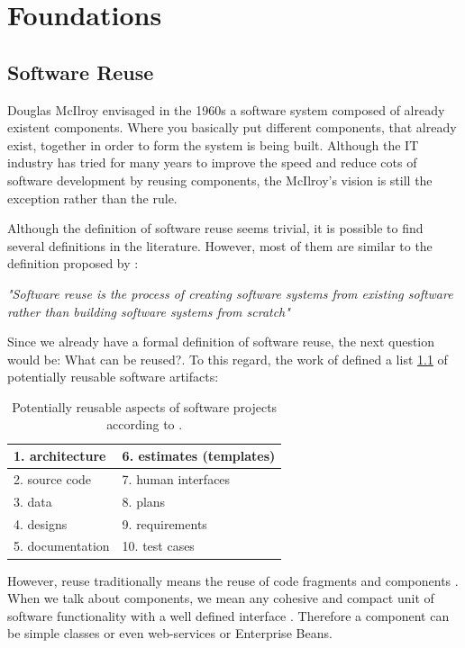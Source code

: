 \chapter{Foundations}

\section{Software Reuse}
\label{chap:sw-reuse}
Douglas McIlroy \cite{McIlroy1968} envisaged in the 1960s a software system composed of already existent components. Where you basically put different components, that already exist, together in order to form the system is being built. Although the IT industry has tried for many years to improve the speed and reduce cots of software development by reusing components, the McIlroy's vision is still the exception rather than the rule.

Although the definition of software reuse seems trivial, it is possible to find several definitions in the literature. However, most of them are similar to the definition proposed by \cite{Krueger1992}:

\textit{"Software reuse is the process of creating software systems from existing software rather than building software systems from scratch"}

Since we already have a formal definition of software reuse, the next question would be: What can be reused?. To this regard, the work of \cite{Frakes1996} defined a list \ref{reusable-list} of potentially reusable software artifacts:

\begin{table}[]
\centering
\label{reusable-list}
	\begin{tabular}{|l|l|}
		\hline
		1. architecture						 & 6. estimates (templates) \\ \hline
		2. source code  						 & 7. human interfaces      \\ \hline
		3. data                               & 8. plans                 \\ \hline
		4. designs                            & 9. requirements          \\ \hline
		5. documentation                      & 10. test cases           \\ \hline
	\end{tabular}
	\caption{Potentially reusable aspects of software projects according to \cite{Frakes1996}.}
\end{table}

However, reuse traditionally means the reuse of code fragments and components \cite{Mili2002}. When we talk about components, we mean any cohesive and compact unit of software functionality with a well defined interface \cite{Hummel2008}. Therefore a component can be simple classes or even web-services or Enterprise Beans.

